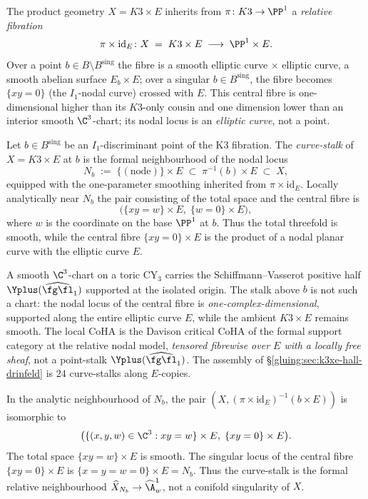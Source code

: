 The product geometry $X = K3 \times E$ inherits from $\pi \colon K3 \to
\PP^1$ a \emph{relative fibration}
\[
 \pi \times \mathrm{id}_E \colon X \;=\; K3 \times E
 \;\longrightarrow\; \PP^1 \times E.
\]
Over a point $b \in B \setminus B^{\mathrm{sing}}$ the fibre is a
smooth elliptic curve $\times$ elliptic curve, a smooth abelian surface
$E_b \times E$; over a singular $b \in B^{\mathrm{sing}}$, the fibre
becomes $\{xy = 0\}$ (the $I_1$-nodal curve) crossed with $E$. This
central fibre is one-dimensional higher than its $K3$-only cousin and
one dimension lower than an interior smooth $\C^3$-chart; its nodal
locus is an \emph{elliptic curve}, not a point.

\begin{definition}
\label{gluing:def:curve-stalk}
Let $b \in B^{\mathrm{sing}}$ be an $I_1$-discriminant point of the
K3 fibration. The \emph{curve-stalk} of $X = K3 \times E$ at $b$ is the
formal neighbourhood of the nodal locus
\[
 N_b \;:=\; \{(\mathrm{node})\} \times E \;\subset\; \pi^{-1}(b)
 \times E \;\subset\; X,
\]
equipped with the one-parameter smoothing inherited from
$\pi\times\mathrm{id}_E$. Locally analytically near $N_b$ the pair
consisting of the total space and the central fibre is
\[
 \bigl(\{xy = w\}\times E,\; \{w=0\}\times E\bigr),
\]
where \(w\) is the coordinate on the base \(\PP^1\) at \(b\). Thus
the total threefold is smooth, while the central fibre
\(\{xy=0\}\times E\) is the product of a nodal planar curve with the
elliptic curve \(E\).
\end{definition}

\begin{remark}
\label{gluing:rem:not-smooth-C3}
A smooth $\C^3$-chart on a toric CY$_3$ carries the
Schiffmann--Vasserot positive half $\Yplus(\widehat{\fg\fl}_1)$
supported at the isolated origin. The stalk above $b$ is not such a
chart: the nodal locus of the central fibre is
\emph{one-complex-dimensional}, supported along the entire elliptic
curve \(E\), while the ambient \(K3\times E\) remains smooth. The
local CoHA is the Davison critical CoHA of the formal support
category at the relative nodal model, \emph{tensored fibrewise over
$E$ with a locally free sheaf}, not a point-stalk
$\Yplus(\widehat{\fg\fl}_1)$. The assembly of
\S\ref{gluing:sec:k3xe-hall-drinfeld} is $24$ curve-stalks along
$E$-copies.
\end{remark}

\begin{proposition}
\label{gluing:prop:local-model-curve-stalk}
In the analytic neighbourhood of \(N_b\), the pair
\((X,(\pi\times\mathrm{id}_E)^{-1}(b\times E))\) is isomorphic to
\[
 \bigl(\{(x,y,w)\in\C^3:xy=w\}\times E,\;
       \{xy=0\}\times E\bigr).
\]
The total space \(\{xy=w\}\times E\) is smooth. The singular locus of
the central fibre \(\{xy=0\}\times E\) is
\(\{x=y=w=0\}\times E=N_b\). Thus the curve-stalk is the formal
relative neighbourhood \(\widehat{X}_{N_b}\to\widehat{\A}^1_w\), not a
conifold singularity of \(X\).
\end{proposition}

